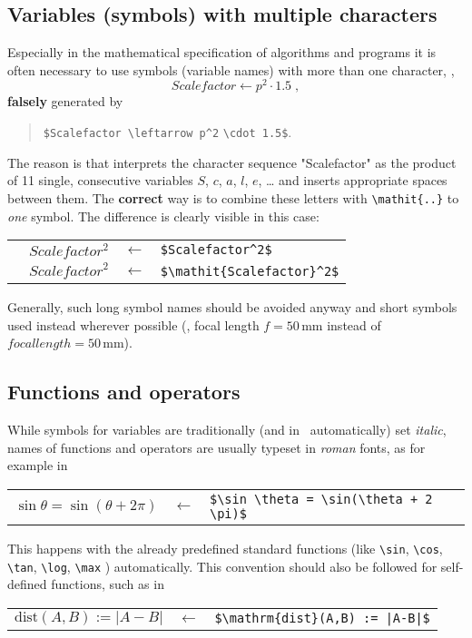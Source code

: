 \subsection{Variables (symbols) with multiple characters}

Especially in the mathematical specification of algorithms and programs
it is often necessary to use symbols (variable names) with more than one
character, \eg,
%
	\[Scalefactor\leftarrow p^2 \cdot 1.5 \; ,\]
%
\textbf{falsely} generated by
%
\begin{quote}
	\verb!$Scalefactor \leftarrow p^2! \verb!\cdot 1.5$!.
\end{quote}
%
The reason is that \latex interprets the character sequence "Scalefactor" as
the product of 11 single, consecutive variables $S$, $c$, $a$, $l$, $e$, \ldots
and inserts appropriate spaces between them.
The \textbf{correct} way is to combine these letters with \verb!\mathit{..}! to 
\emph{one} symbol. The difference is clearly visible in this case:
%
\begin{center}
	\setlength{\tabcolsep}{4pt}
	\begin{tabular}{llll}
		\text{Wrong:}  & $Scalefactor^2$          & $\leftarrow$ &
		\verb!$Scalefactor^2$!          \\
		\text{Correct:} & $\mathit{Scalefactor}^2$ & $\leftarrow$ &
		\verb!$\mathit{Scalefactor}^2$!
	\end{tabular}
\end{center}
%
Generally, such long symbol names should be avoided anyway and short symbols
used instead wherever possible (\eg, focal length $f = 50 \, \mathrm{mm}$ 
instead of $\mathit{focal length} = 50 \, \mathrm{mm}$).


\subsection{Functions and operators}

While symbols for variables are traditionally (and in \latex\ automatically)
set \emph{italic}, names of functions and operators are usually typeset in
\emph{roman} fonts, as for example in
%
\begin{center}
	\begin{tabular}{lcl}
		$\sin \theta = \sin(\theta + 2 \pi)$ &
		$\leftarrow$ & \verb!$\sin \theta = \sin(\theta + 2 \pi)$! \\
	\end{tabular}
\end{center}
%
This happens with the already predefined standard functions (like \verb!\sin!, 
\verb!\cos!, \verb!\tan!, \verb!\log!, \verb!\max! \uva) automatically.
This convention should also be followed for self-defined functions, such as in
%
\begin{center}
	\begin{tabular}{lcl}
	$\mathrm{dist}(A,B) := |A-B|$ & $\leftarrow$ & 
	\verb!$\mathrm{dist}(A,B) := |A-B|$! \\
	\end{tabular}
\end{center}


